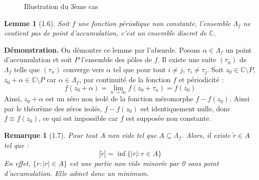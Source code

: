 \documentclass{article}
\newtheorem{lemma}{Lemme}
\newtheorem{remark}{Remarque}
\begin{document}
\begin{figure}[h]
    \centering
    \caption{Illustration du 3ème cas}
    \end{figure}
    
    
\begin{lemma}[1.6]
Soit \( f \) une fonction périodique non constante, l'ensemble \( \Lambda_f \) ne contient pas de point d'accumulation, c'est un ensemble discret de \( \mathbb{C} \).
\end{lemma}

\textbf{Démonstration.}
On démontre ce lemme par l'absurde. Posons \( \alpha \in \Lambda_f \) un point d'accumulation et soit \( P \) l'ensemble des pôles de \( f \). Il existe une suite \( (\tau_n) \) de \( \Lambda_f \) telle que \( (\tau_n) \) converge vers \( \alpha \) tel que pour tout \( i \neq j \), \( \tau_i \neq \tau_j \). Soit \( z_0 \in \mathbb{C}\setminus P \), \( z_0 + \alpha \in \mathbb{C}\setminus P \) car \( \alpha \in \Lambda_f \), par continuité de la fonction \( f \) et périodicité : 
\[
f(z_0 + \alpha) = \lim_{n \to \infty} f(z_0 + \tau_n) = f(z_0)
\]
Ainsi, \( z_0 + \alpha \) est un zéro non isolé de la fonction méromorphe \( f - f(z_0) \). Ainsi par le théorème des zéros isolés, \( f - f(z_0) \) est identiquement nulle, donc \( f \equiv f(z_0) \), ce qui est impossible car \( f \) est supposée non constante.

\begin{remark}[1.7]
    Pour tout \( A \) non vide tel que \( A \subseteq \Lambda_f \). Alors, il existe \( \tilde{r} \in A \) tel que :
    \[ |\tilde{r}| = \inf\{|r|: r \in A\} \]
    En effet, \( \{r : |r| \in A\} \) est une partie non vide minorée par 0 sans point d'accumulation. Elle admet donc un minimum.

\end{remark}
\end{document}
